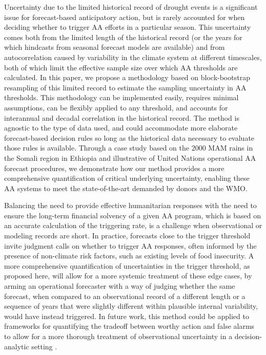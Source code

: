 \documentclass{ametsocV6.1}
\begin{document}
Uncertainty due to the limited historical record of drought events is a significant issue for forecast-based anticipatory action, but is rarely accounted for when deciding whether to trigger AA efforts in a particular season. This uncertainty comes both from the limited length of the historical record (or the years for which hindcasts from seasonal forecast models are available) and from autocorrelation caused by variability in the climate system at different timescales, both of which limit the effective sample size over which AA thresholds are calculated. In this paper, we propose a methodology based on block-bootstrap resampling of this limited record to estimate the sampling uncertainty in AA thresholds. This methodology can be implemented easily, requires minimal assumptions, can be flexibly applied to any threshold, and accounts for interannual and decadal correlation in the historical record. The method is agnostic to the type of data used, and could accommodate more elaborate forecast-based decision rules so long as the historical data necessary to evaluate those rules is available. Through a case study based on the 2000 MAM rains in the Somali region in Ethiopia and illustrative of United Nations operational AA forecast procedures, we demonstrate how our method provides a more comprehensive quantification of critical underlying uncertainty, enabling these AA systems to meet the state-of-the-art demanded by donors and the WMO.

Balancing the need to provide effective humanitarian responses with the need to ensure the long-term financial solvency of a given AA program, which is based on an accurate calculation of the triggering rate, is a challenge when observational or modeling records are short. In practice, forecasts close to the trigger threshold invite judgment calls on whether to trigger AA responses, often informed by the presence of non-climate risk factors, such as existing levels of food insecurity. A more comprehensive quantification of uncertainties in the trigger threshold, as proposed here, will allow for a more systemic treatment of these edge cases, by arming an operational forecaster with a way of judging whether the same forecast, when compared to an observational record of a different length or a sequence of years that were slightly different within plausible internal variability, would have instead triggered. In future work, this method could be applied to frameworks for quantifying the tradeoff between worthy action and false alarms to allow for a more thorough treatment of observational uncertainty in a decision-analytic setting \citep{jaime_long_2026}. 
\end{document}
